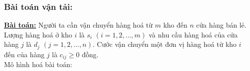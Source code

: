 \documentclass{article}
\begin{document}
\subsubsection{Bài toán vận tải:}
\textbf{\underline{Bài toán:}} Người ta cần vận chuyển hàng hoá từ $m$ kho đến $n$ cửa hàng bán lẻ. Lượng hàng hoá ở kho $i$ là $s_i$ $(i=1,2,...,m)$ và nhu cầu hàng hoá của cửa hàng $j$ là $d_j$ $(j=1,2,...,n)$. Cước vận chuyển một đơn vị hàng hoá từ kho $i$ đến của hàng $j$ là $c_{ij} \geq 0$ đồng.\medskip \\
\indent Mô hình hoá bài toán:
\end{document}
